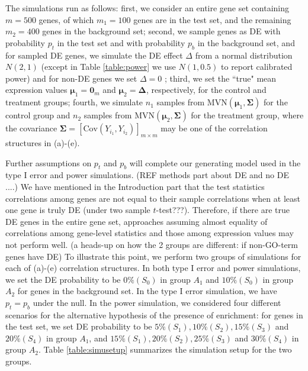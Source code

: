\documentclass[a4,center,fleqn]{NAR}
\newcommand{\aaCase}{a}
\newcommand{\fCase}{e}
\begin{document}
	The simulations run as follows: first, we consider an entire gene set containing $m=500$ genes,
	of which $m_1 = 100$ genes are in the test set, and the
	remaining $m_2=400$ genes in the background set; second, we sample genes as DE with probability $p_t$ in the test set and with probability $p_b$ in the background set, and for sampled DE genes, we simulate the DE effect $\Delta$ from  a normal distribution $N(2, 1)$ (except in Table \ref{table:power} we use $N(1, 0.5)$ to report calibrated power) and for non-DE genes we set $\Delta= 0$ ; third, we set the ``true" mean expression values $\bm \mu_1 = \bm 0_m$ and $\bm \mu_2 = \bm \Delta$, respectively,
	for the control and treatment groups; fourth, we simulate $n_1$ samples from $\text{MVN}(\bm \mu_1,
	\bm \Sigma)$ for the control group and $n_2$ samples from $\text{MVN}(\bm \mu_2, \bm \Sigma)$ for
	the treatment group, where the covariance $\bm \Sigma = \left[\text{Cov}(Y_{i_1},
	Y_{i_2})\right]_{m\times m}$ may be one of the correlation structures in (\aaCase)-(\fCase).
	
	Further assumptions on $p_t$ and $p_b$ will complete our generating model used in the type I error and power simulations. (REF methods part about DE and no DE ....)
	We have mentioned in the Introduction part that the test statistics correlations among genes are
	not equal to their sample correlations when at least one gene is truly DE (under two sample
	$t$-test???). Therefore, if there are true DE genes in the entire gene set, approaches assuming
	almost equality of correlations among gene-level statistics and those among expression values may
	not perform well. (a heads-up on how the 2 groups are different: if non-GO-term genes have DE) To illustrate this point, we perform two groups of simulations for each of 
	(\aaCase)-(\fCase) correlation structures. In both type I error and power simulations, we set the DE
	probability to be $0\%(S_0)$ in group $A_1$ and $10\%(S_0)$ in group $A_2$ for genes in the
	background set. In the type I error simulation, we have $p_t = p_b$ under the null. In the power
	simulation, we considered four different scenarios for the alternative hypothesis of the presence of enrichment: for genes in the test set, we set DE
	probability to be $5\% (S_1), 10\%(S_2), 15\%(S_3)$ and $20\%(S_4)$ in group $A_1$, and $15\%(S_1),
	20\%(S_2), 25\%(S_3)$ and $30\%(S_4)$ in group $A_2$. Table \ref{table:simusetup} summarizes the
	simulation setup for the two groups.
	
	
\end{document}
